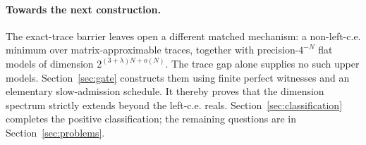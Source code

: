 \paragraph{Towards the next construction.}
The exact-trace barrier leaves open a different matched mechanism: a non-left-c.e. minimum over matrix-approximable traces, together with precision-$4^{-N}$ flat models of dimension $2^{(3+\lambda)N+o(N)}$. The trace gap alone supplies no such upper models. Section~\ref{sec:gate} constructs them using finite perfect witnesses and an elementary slow-admission schedule. It thereby proves that the dimension spectrum strictly extends beyond the left-c.e. reals. Section~\ref{sec:classification} completes the positive classification; the remaining questions are in Section~\ref{sec:problems}.
